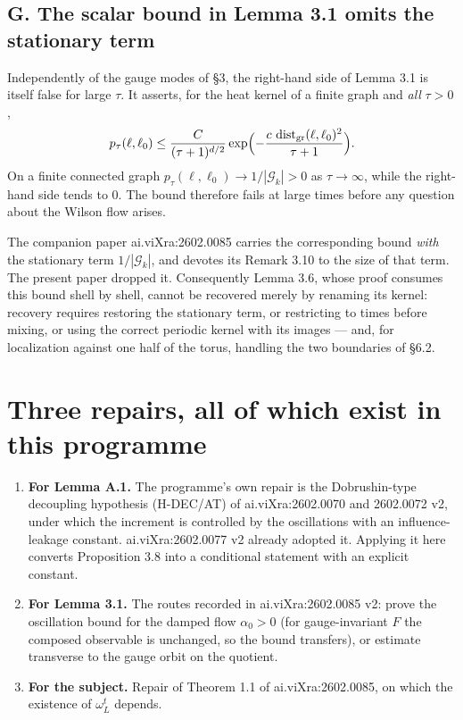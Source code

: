 \documentclass[11pt]{article}
\begin{document}
\subsection{G. The scalar bound in Lemma 3.1 omits the stationary term}

Independently of the gauge modes of \S3, the right-hand side of Lemma 3.1 is itself
false for large $\tau$. It asserts, for the heat kernel of a finite graph and
\emph{all} $\tau>0$,
\[
p_\tau(\ell,\ell_0)\le\frac{C}{(\tau+1)^{d/2}}
\exp\Bigl(-\frac{c\,\operatorname{dist}_{\mathrm{gr}}(\ell,\ell_0)^2}{\tau+1}\Bigr).
\]
On a finite connected graph $p_\tau(\ell,\ell_0)\to1/|\mathcal G_k|>0$ as
$\tau\to\infty$, while the right-hand side tends to $0$. The bound therefore fails at
large times before any question about the Wilson flow arises.

The companion paper ai.viXra:2602.0085 carries the corresponding bound \emph{with} the
stationary term $1/|\mathcal G_k|$, and devotes its Remark 3.10 to the size of that
term. The present paper dropped it. Consequently Lemma 3.6, whose proof consumes this
bound shell by shell, cannot be recovered merely by renaming its kernel: recovery
requires restoring the stationary term, or restricting to times before mixing, or
using the correct periodic kernel with its images --- and, for localization against
one half of the torus, handling the two boundaries of \S6.2.

\section{Three repairs, all of which exist in this programme}

\begin{enumerate}
\item[(a)] \textbf{For Lemma A.1.} The programme's own repair is the Dobrushin-type
decoupling hypothesis (H-DEC/AT) of ai.viXra:2602.0070 and 2602.0072 v2, under which
the increment is controlled by the oscillations with an influence-leakage constant.
ai.viXra:2602.0077 v2 already adopted it. Applying it here converts Proposition 3.8
into a conditional statement with an explicit constant.
\item[(b)] \textbf{For Lemma 3.1.} The routes recorded in ai.viXra:2602.0085 v2: prove
the oscillation bound for the damped flow $\alpha_0>0$ (for gauge-invariant $F$ the
composed observable is unchanged, so the bound transfers), or estimate transverse to
the gauge orbit on the quotient.
\item[(c)] \textbf{For the subject.} Repair of Theorem 1.1 of ai.viXra:2602.0085, on
which the existence of $\omega^t_L$ depends.
\end{enumerate}
\end{document}
